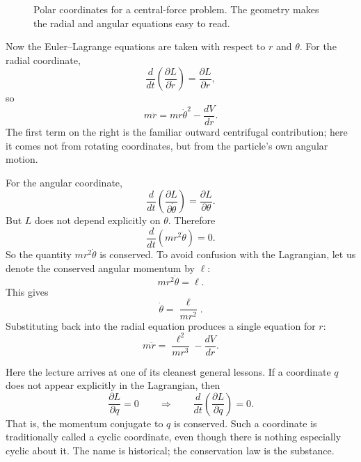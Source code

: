 \begin{figure}[h]
\centering
{}
\caption{Polar coordinates for a central-force problem. The geometry makes the radial and angular equations easy to read.}
\end{figure}

Now the Euler--Lagrange equations are taken with respect to \(r\) and \(\theta\). For the radial coordinate,
\begin{equation}
\frac{d}{dt}\!\left(\frac{\partial L}{\partial \dot r}\right)=\frac{\partial L}{\partial r},
\end{equation}
so
\begin{equation}
m\ddot r=mr\dot\theta^2-\frac{dV}{dr}.
\end{equation}
The first term on the right is the familiar outward centrifugal contribution; here it comes not from rotating coordinates, but from the particle's own angular motion.

For the angular coordinate,
\begin{equation}
\frac{d}{dt}\!\left(\frac{\partial L}{\partial \dot\theta}\right)=\frac{\partial L}{\partial \theta}.
\end{equation}
But \(L\) does not depend explicitly on \(\theta\). Therefore
\begin{equation}
\frac{d}{dt}\!\left(mr^2\dot\theta\right)=0.
\end{equation}
So the quantity \(mr^2\dot\theta\) is conserved. To avoid confusion with the Lagrangian, let us denote the conserved angular momentum by \(\ell\):
\begin{equation}
mr^2\dot\theta=\ell.
\end{equation}
This gives
\begin{equation}
\dot\theta=\frac{\ell}{mr^2}.
\end{equation}
Substituting back into the radial equation produces a single equation for \(r\):
\begin{equation}
m\ddot r=\frac{\ell^2}{mr^3}-\frac{dV}{dr}.
\end{equation}

Here the lecture arrives at one of its cleanest general lessons. If a coordinate \(q\) does not appear explicitly in the Lagrangian, then
\begin{equation}
\frac{\partial L}{\partial q}=0
\qquad \Longrightarrow \qquad
\frac{d}{dt}\!\left(\frac{\partial L}{\partial \dot q}\right)=0.
\end{equation}
That is, the momentum conjugate to \(q\) is conserved. Such a coordinate is traditionally called a cyclic coordinate, even though there is nothing especially cyclic about it. The name is historical; the conservation law is the substance.

